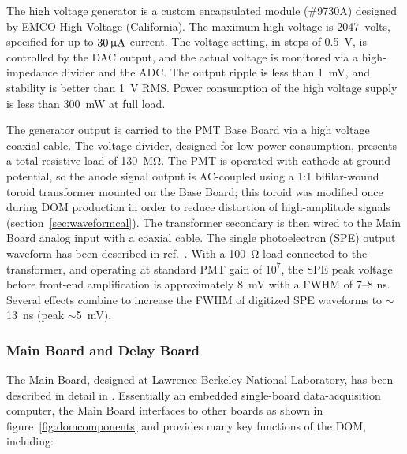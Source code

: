The high voltage generator is a custom encapsulated module (\#9730A) designed by
EMCO High Voltage (California).  The maximum high voltage is
\qty{2047}{volts}, specified for up to $30\,{\rm \upmu A}$ current.  The
voltage setting, in steps of 0.5~V, is controlled by the DAC
output, and the actual voltage is monitored via a high-impedance divider and the ADC.  The output ripple
is less than \qty{1}{mV}, and stability is better than \qty{1}{V} RMS.  Power
consumption of the high voltage supply is less than \qty{300}{mW} at full
load. 

The generator output is carried to the PMT Base Board \cite{ICECUBE:PMT} via a high voltage
coaxial cable.  The voltage divider, designed for low power consumption,
presents a total resistive load of \qty{130}{\mega\ohm}. 
The PMT is operated with cathode at ground potential, so the anode signal output is AC-coupled using 
a 1:1 bifilar-wound toroid transformer mounted on the Base Board; this
toroid was modified once during DOM production in order to reduce
distortion of high-amplitude signals (section~\ref{sec:waveformcal}).
The transformer secondary is then wired to the Main Board analog input with a coaxial cable.
The single photoelectron (SPE) output waveform has been described in ref.~\cite{ICECUBE:PMT}.  
With a \qty{100}{\ohm} load connected to the transformer, and operating
at standard PMT gain of $10^7$, the SPE 
peak voltage before front-end amplification is approximately \qty{8}{mV}
with a FWHM of 7--8 ns.  Several effects combine to increase
the FWHM of digitized SPE waveforms to $\sim$\qty{13}{ns} (peak $\sim$\qty{5}{mV}).

\subsubsection{\label{sec:mainboard}Main Board and Delay Board}

The Main Board, designed at Lawrence Berkeley National Laboratory,
has been described in detail in \cite{ICECUBE:DAQ}.   
Essentially an embedded single-board data-acquisition computer, the Main
Board interfaces to other boards as shown in figure~\ref{fig:domcomponents} and
provides many key functions of the DOM, including:


